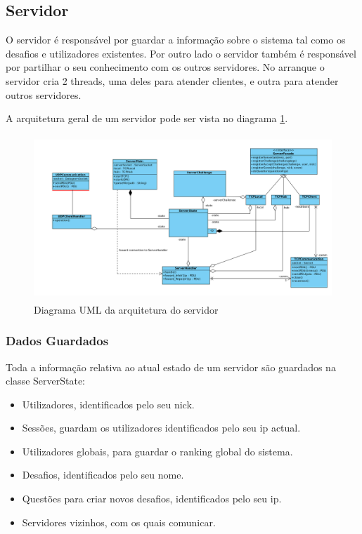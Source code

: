 \documentclass[runningheads,a4paper]{llncs}
\begin{document}
\subsection{Servidor}

O servidor é responsável por guardar a informação sobre o sistema tal como os desafios e utilizadores existentes. Por outro lado o servidor também é responsável por partilhar o seu conhecimento com os outros servidores.
No arranque o servidor cria 2 threads, uma deles para atender clientes, e outra para atender outros servidores.

A arquitetura geral de um servidor pode ser vista no diagrama \ref{fig:diagram-arq-geral}.

\begin{figure}
\centering
\includegraphics[height=6.2cm]{arq-geral.png}
\caption{Diagrama UML da arquitetura do servidor}
\label{fig:diagram-arq-geral}
\end{figure}


\subsubsection{Dados Guardados}

Toda a informação relativa ao atual estado de um servidor são guardados na classe ServerState:
\begin{itemize}
  \item Utilizadores, identificados pelo seu nick.
  \item Sessões, guardam os utilizadores identificados pelo seu ip actual.
  \item Utilizadores globais, para guardar o ranking global do sistema.
  \item Desafios, identificados pelo seu nome.
  \item Questões para criar novos desafios, identificados pelo seu ip.
  \item Servidores vizinhos, com os quais comunicar.
\end{itemize}
\end{document}

